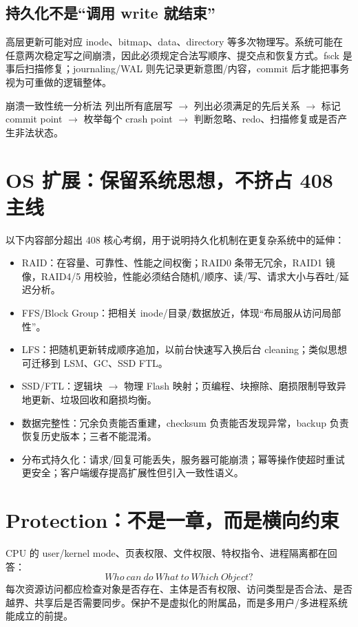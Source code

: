 \documentclass[11pt,a4paper,openany]{ctexbook}
\begin{document}
\subsection{持久化不是“调用 write 就结束”}
高层更新可能对应 inode、bitmap、data、directory 等多次物理写。系统可能在任意两次稳定写之间崩溃，因此必须规定合法写顺序、提交点和恢复方式。fsck 是事后扫描修复；journaling/WAL 则先记录更新意图/内容，commit 后才能把事务视为可重做的逻辑整体。

\begin{methodbox}{崩溃一致性统一分析法}
列出所有底层写 $\rightarrow$ 列出必须满足的先后关系 $\rightarrow$ 标记 commit point $\rightarrow$ 枚举每个 crash point $\rightarrow$ 判断忽略、redo、扫描修复或是否产生非法状态。
\end{methodbox}

\section{OS 扩展：保留系统思想，不挤占 408 主线}
以下内容部分超出 408 核心考纲，用于说明持久化机制在更复杂系统中的延伸：
\begin{itemize}
  \item RAID：在容量、可靠性、性能之间权衡；RAID0 条带无冗余，RAID1 镜像，RAID4/5 用校验，性能必须结合随机/顺序、读/写、请求大小与吞吐/延迟分析。
  \item FFS/Block Group：把相关 inode/目录/数据放近，体现“布局服从访问局部性”。
  \item LFS：把随机更新转成顺序追加，以前台快速写入换后台 cleaning；类似思想可迁移到 LSM、GC、SSD FTL。
  \item SSD/FTL：逻辑块 $\rightarrow$ 物理 Flash 映射；页编程、块擦除、磨损限制导致异地更新、垃圾回收和磨损均衡。
  \item 数据完整性：冗余负责能否重建，checksum 负责能否发现异常，backup 负责恢复历史版本；三者不能混淆。
  \item 分布式持久化：请求/回复可能丢失，服务器可能崩溃；幂等操作使超时重试更安全；客户端缓存提高扩展性但引入一致性语义。
\end{itemize}

\section{Protection：不是一章，而是横向约束}
CPU 的 user/kernel mode、页表权限、文件权限、特权指令、进程隔离都在回答：
\[
\boxed{Who\ can\ do\ What\ to\ Which\ Object?}
\]
每次资源访问都应检查对象是否存在、主体是否有权限、访问类型是否合法、是否越界、共享后是否需要同步。保护不是虚拟化的附属品，而是多用户/多进程系统能成立的前提。
\end{document}
